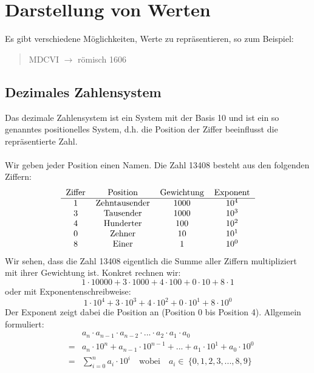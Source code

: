 \documentclass{report}
\begin{document}
\section{Darstellung von Werten}
Es gibt verschiedene Möglichkeiten, Werte zu repräsentieren, so zum Beispiel:
\begin{quote}MDCVI $\to$ römisch 1606\end{quote}
\subsection{Dezimales Zahlensystem}
Das dezimale Zahlensystem ist ein System mit der Basis 10 und ist ein so genanntes positionelles System, d.h. die Position der Ziffer beeinflusst die repräsentierte Zahl.
\\\\Wir geben jeder Position einen Namen. Die Zahl 13408 besteht aus den folgenden Ziffern:
\begin{equation}\begin{tabular}{c c c c}
Ziffer & Position & Gewichtung & Exponent \\
\hline
1 & Zehntausender & 1000 & $10^4$ \\
3 & Tausender &  1000 & $10^3$ \\
4 & Hunderter & 100 & $10^2$ \\
0 & Zehner & 10 & $10^1$ \\
8 & Einer & 1 & $10^0$ \\
\end{tabular}\end{equation}
Wir sehen, dass die Zahl 13408 eigentlich die Summe aller Ziffern multipliziert mit ihrer Gewichtung ist. Konkret rechnen wir:
\begin{equation}1 \cdot 10000 + 3 \cdot 1000 + 4 \cdot 100 + 0 \cdot 10 + 8 \cdot 1\end{equation}
oder mit Exponentenschreibweise:
\begin{equation}1 \cdot 10^4 + 3 \cdot 10^3 + 4 \cdot 10^2 + 0 \cdot 10^1 + 8 \cdot 10^0\end{equation}
Der Exponent zeigt dabei die Position an (Position 0 bis Position 4). Allgemein formuliert:
\begin{eqnarray}&&a_n \cdot a_{n-1} \cdot a_{n-2} \cdot ... \cdot a_2 \cdot a_1 \cdot a_0 \nonumber \\
&=&a_n \cdot 10^n + a_{n-1} \cdot 10^{n-1} + ... + a_1 \cdot 10^1 + a_0 \cdot 10^0 \nonumber \\
&=&\sum_{i=0}^{n} a_i \cdot 10^i \quad \mbox{wobei}\quad a_i \in\ \{0, 1, 2, 3, ..., 8, 9\}\end{eqnarray}
\end{document}
